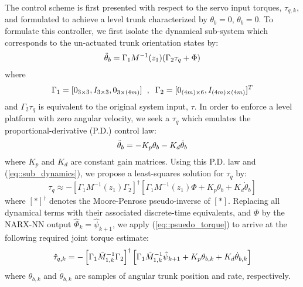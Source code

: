 The control scheme is first presented with respect to the servo input torques, $\tau_{q,k}$, and formulated to achieve a level trunk characterized by $\theta_{b}=0$, $\dot{\theta}_{b}= 0$. To formulate this controller, we first isolate the dynamical sub-system which corresponds to the un-actuated trunk orientation states by:
	\begin{equation}
		\vspace{-3.5mm}
		\begin{split}
		\ddot{\theta}_{b} 	= \Gamma_{1} M^{-1}(z_{1})( \Gamma_{2}\tau_{q}	 + \Phi) \\
		\end{split}	
		\label{eq::sub_dynamics}
	\end{equation}
where 
	\begin{equation*}
		\Gamma_{1} = [0_{3\times3},I_{3\times3},0_{3\times(4m)}] 
		\hspace{2mm},\hspace{2mm} 
		\Gamma_{2} = [0_{(4m)\times6},I_{(4m)\times(4m)}]^{T}
	\end{equation*}
and $\Gamma_{2}\tau_{q}$ is equivalent to the original system input, $\tau$. In order to enforce a level platform with zero angular velocity, we seek a $\tau_{q}$ which emulates the proportional-derivative (P.D.) control law:
	\begin{equation}
		\vspace{-1mm}
	 	\ddot{\theta}_{b} = - K_{p}{\theta}_{b} - K_{d}\dot{\theta}_{b}
	\end{equation}
where $K_{p}$ and $K_{d}$ are constant gain matrices. Using this P.D. law and (\ref{eq::sub_dynamics}), we propose a least-squares solution for $\tau_{q}$ by:
	\begin{equation}
		\tau_{q} \approx  -
		\left[\Gamma_{1} M^{-1}(z_{1}) \Gamma_{2}\right]^{\dagger}
		\left[\Gamma_{1} M^{-1}(z_{1}) \Phi + K_{p}{\theta}_{b} + K_{d}\dot{\theta}_{b} \right]
		\label{eq::psuedo_torque}
	\end{equation}
where $\left[*\right]^{\dagger}$ denotes the Moore-Penrose pseudo-inverse of $[*]$.
Replacing all dynamical terms with their associated discrete-time equivalents, and $\Phi$ by the NARX-NN output $\hat{\Phi}_{k}=\hat{\psi}_{k+1}$, we apply (\ref{eq::psuedo_torque}) to arrive at the following required joint torque estimate:
	\vspace{-1mm}
	\begin{equation}
		\vspace{-1mm}
		\hat{\tau}_{q,k} = -
		\left[\Gamma_{1} \hat{M}^{-1}_{1,k} \Gamma_{2}\right]^{\dagger} 
		\left[\Gamma_{1}\hat{M}^{-1}_{1,k}\hat{\psi}_{k+1} + K_{p}{\theta}_{b,k} + K_{d}\dot{\theta}_{b,k} \right]
		\label{eq::psuedo_torque_k}
	\end{equation}
where ${\theta}_{b,k}$ and $\dot{\theta}_{b,k}$ are samples of angular trunk position and rate, respectively.

